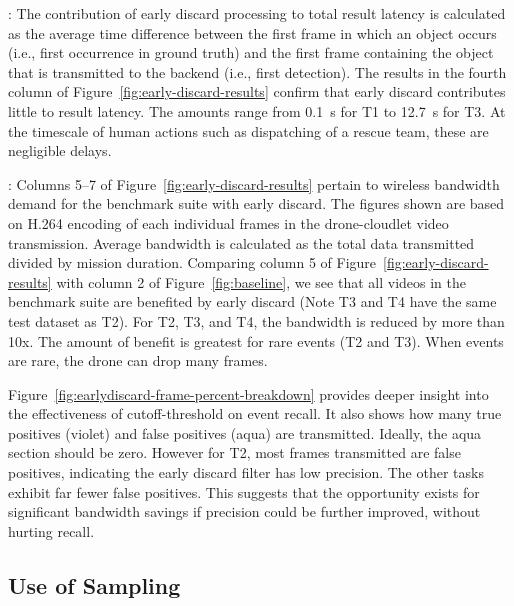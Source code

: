 :
The contribution of early discard processing to total result latency
is calculated as the average time difference between the first frame
in which an object occurs (i.e., first occurrence in ground truth) and
the first frame containing the object that is transmitted to the
backend (i.e., first detection).  The results in the fourth column of
Figure~\ref{fig:early-discard-results} confirm that early discard
contributes little to result latency.  The amounts range from 0.1~s
for T1 to 12.7~s for T3.  At the timescale of human actions
such as dispatching of a rescue team, these are negligible delays.

: Columns 5--7 of
Figure~\ref{fig:early-discard-results} pertain to wireless bandwidth demand for
the benchmark suite with early discard.  The figures shown are based on H.264
encoding of each individual frames in the drone-cloudlet video transmission.
Average bandwidth is calculated as the total data transmitted divided by
mission duration.  Comparing column 5 of Figure~\ref{fig:early-discard-results}
with column 2 of Figure~\ref{fig:baseline}, we see that all videos in the
benchmark suite are benefited by early discard (Note T3 and T4 have the same
test dataset as T2). For T2, T3, and T4, the bandwidth is reduced by more than
10x. The amount of benefit is greatest for rare events (T2 and T3).  When
events are rare, the drone can drop many frames.

Figure~\ref{fig:earlydiscard-frame-percent-breakdown} provides deeper insight
into the effectiveness of cutoff-threshold on event recall. It also shows how
many true positives (violet) and false positives (aqua) are
transmitted. Ideally, the aqua section should be zero.  However for T2, most
frames transmitted are false positives, indicating the early discard filter has
low precision.  The other tasks exhibit far fewer false positives.  This
suggests that the opportunity exists for significant bandwidth savings if
precision could be further improved, without hurting recall.


\subsection{Use of Sampling}

